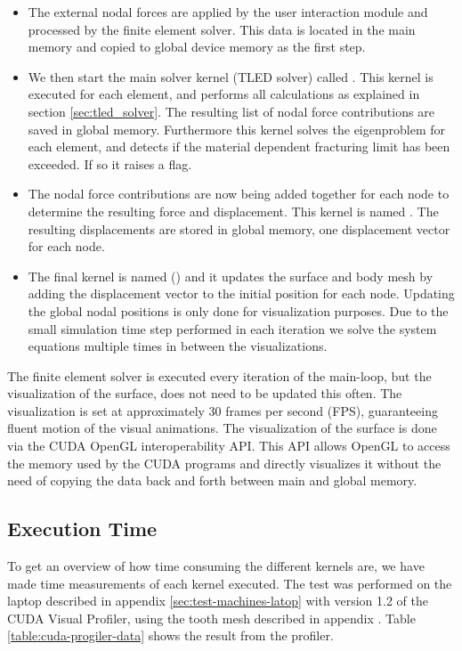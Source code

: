 \begin{itemize}
\item The external nodal forces are applied by the user interaction
  module and processed by the finite element solver. This data is located in the
  main memory and copied to global device memory as the first step.
\item We then start the main solver kernel (TLED solver) called
  . This kernel is executed for each
  element, and performs all calculations as explained in section
  \vref{sec:tled_solver}.
  The resulting list of nodal force contributions are saved in global memory.
  Furthermore this kernel solves the eigenproblem for each element, and
  detects if the material dependent fracturing limit has been
  exceeded. If so it raises a flag.
\item The nodal force contributions are now being added together for each
  node to determine the resulting force and displacement. This kernel
  is named . The resulting displacements
  are stored in global memory, one displacement vector for each node.
\item The final kernel is named () and it updates the
  surface and body mesh by adding the displacement vector to the
  initial position for each node. Updating the global nodal positions
  is only done for visualization purposes. Due to the small
  simulation time step performed in each iteration we solve the system
  equations multiple times in between the visualizations. 
\end{itemize}

The finite element solver is executed every iteration of the main-loop, but 
the visualization of the surface, does not need to be updated this
often. The visualization is set at approximately 30 frames per second
(FPS), guaranteeing fluent motion of the visual animations.
%
The visualization of the surface is done via the CUDA OpenGL
interoperability API. This API allows OpenGL to access the memory used
by the CUDA programs and directly visualizes it without the need of
copying the data back and forth between main and global memory.

\subsection{Execution Time}
\label{sec:exection_time}
To get an overview of how time consuming the different kernels are, we
have made time measurements of each kernel executed.
The test was performed on the laptop described in appendix
\vref{sec:test-machines-latop} with version 1.2 of the CUDA Visual
Profiler, using the tooth mesh described in appendix
. Table \vref{table:cuda-progiler-data} shows
the result from the profiler.

